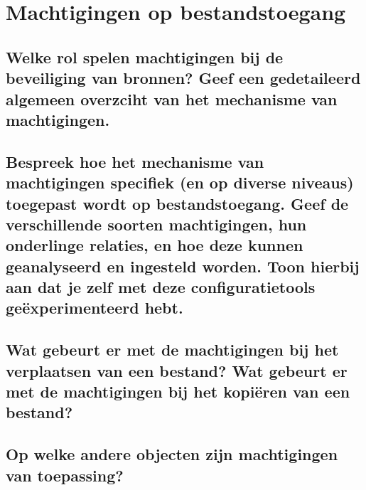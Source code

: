 \chapter{Machtigingen op bestandstoegang}

\section{Welke rol spelen machtigingen bij de beveiliging van bronnen? Geef een
gedetaileerd algemeen overzciht van het mechanisme van machtigingen.}

\section{Bespreek hoe het mechanisme van machtigingen specifiek (en op diverse
niveaus) toegepast wordt op bestandstoegang. Geef de verschillende soorten
machtigingen, hun onderlinge relaties, en hoe deze kunnen geanalyseerd en
ingesteld worden. Toon hierbij aan dat je zelf met deze configuratietools
geëxperimenteerd hebt.}

\section{Wat gebeurt er met de machtigingen bij het verplaatsen van een bestand?
Wat gebeurt er met de machtigingen bij het kopiëren van een bestand?}

\section{Op welke andere objecten zijn machtigingen van toepassing?}
